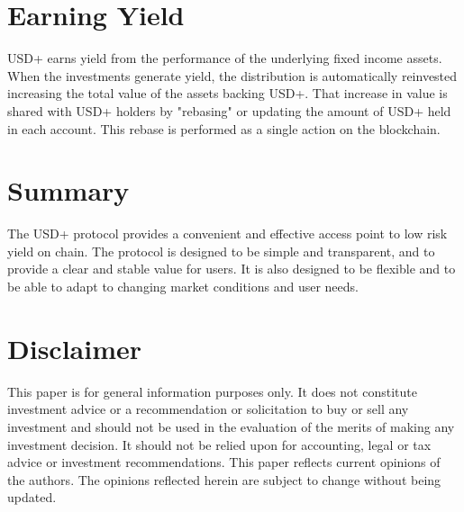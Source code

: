 \documentclass[sigconf,nonacm,prologue,table]{acmart}
\begin{document}
\section{Earning Yield}
\label{sec:lockups}

USD+ earns yield from the performance of the underlying fixed income assets. When the investments generate yield, the distribution is automatically reinvested increasing the total value of the assets backing USD+. That increase in value is shared with USD+ holders by "rebasing" or updating the amount of USD+ held in each account. This rebase is performed as a single action on the blockchain.

\section{Summary}

The USD+ protocol provides a convenient and effective access point to low risk yield on chain. The protocol is designed to be simple and transparent, and to provide a clear and stable value for users. It is also designed to be flexible and to be able to adapt to changing market conditions and user needs.

% 
% 

\section*{Disclaimer}

This paper is for general information purposes only. It does not constitute investment advice or a recommendation or solicitation to buy or sell any investment and should not be used in the evaluation of the merits of making any investment decision. It should not be relied upon for accounting, legal or tax advice or investment recommendations.  This paper reflects current opinions of the authors. The opinions reflected herein are subject to change without being updated. 
\end{document}
